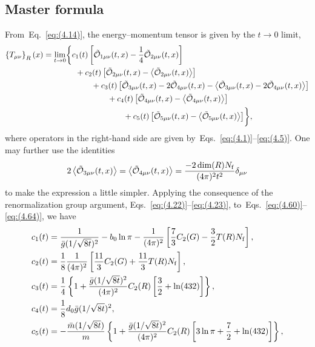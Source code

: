 \subsection{Master formula}
From~Eq.~\eqref{eq:(4.14)}, the energy--momentum tensor is given by the $t\to0$
limit,
\begin{align}
   \left\{T_{\mu\nu}\right\}_R(x)
   &=\lim_{t\to0}\biggl\{c_1(t)\left[
   \Tilde{\mathcal{O}}_{1\mu\nu}(t,x)
   -\frac{1}{4}\Tilde{\mathcal{O}}_{2\mu\nu}(t,x)
   \right]
\notag\\
   &\qquad\qquad{}
   +c_2(t)\left[
   \Tilde{\mathcal{O}}_{2\mu\nu}(t,x)
   -\left\langle\Tilde{\mathcal{O}}_{2\mu\nu}(t,x)\right\rangle
   \right]
\notag\\
   &\qquad\qquad\qquad{}
   +c_3(t)\left[
   \Tilde{\mathcal{O}}_{3\mu\nu}(t,x)
   -2\Tilde{\mathcal{O}}_{4\mu\nu}(t,x)
   -\left\langle
   \Tilde{\mathcal{O}}_{3\mu\nu}(t,x)
   -2\Tilde{\mathcal{O}}_{4\mu\nu}(t,x)
   \right\rangle
   \right]
\notag\\
   &\qquad\qquad\qquad\qquad{}
   +c_4(t)\left[
   \Tilde{\mathcal{O}}_{4\mu\nu}(t,x)
   -\left\langle\Tilde{\mathcal{O}}_{4\mu\nu}(t,x)\right\rangle
   \right]
\notag\\
   &\qquad\qquad\qquad\qquad\qquad{}
   +c_5(t)\left[
   \Tilde{\mathcal{O}}_{5\mu\nu}(t,x)
   -\left\langle\Tilde{\mathcal{O}}_{5\mu\nu}(t,x)\right\rangle
   \right]\biggr\},
\label{eq:(4.70)}
\end{align}
where operators in the right-hand side are given
by~Eqs.~\eqref{eq:(4.1)}--\eqref{eq:(4.5)}. One may further use the identities
\begin{equation}
   2\left\langle\Tilde{\mathcal{O}}_{3\mu\nu}(t,x)\right\rangle
   =\left\langle\Tilde{\mathcal{O}}_{4\mu\nu}(t,x)\right\rangle
   =\frac{-2\dim(R)N_{\mathrm{f}}}{(4\pi)^2t^2}\delta_{\mu\nu}
\label{eq:(4.71)}
\end{equation}
to make the expression a little simpler. Applying the consequence of the
renormalization group argument, Eqs.~\eqref{eq:(4.22)}--\eqref{eq:(4.23)},
to~Eqs.~\eqref{eq:(4.60)}--\eqref{eq:(4.64)}, we have
\begin{align}
   c_1(t)&
   =\frac{1}{\Bar{g}(1/\sqrt{8t})^2}
   -b_0\ln\pi-\frac{1}{(4\pi)^2}
   \left[\frac{7}{3}C_2(G)
   -\frac{3}{2}T(R)N_{\mathrm{f}}\right],
\label{eq:(4.72)}\\
   c_2(t)&
   =\frac{1}{8}
   \frac{1}{(4\pi)^2}
   \left[\frac{11}{3}C_2(G)
   +\frac{11}{3}T(R)N_{\mathrm{f}}\right],
\label{eq:(4.73)}\\
   c_3(t)&
   =\frac{1}{4}\left\{1+\frac{\Bar{g}(1/\sqrt{8t})^2}{(4\pi)^2}C_2(R)
   \left[\frac{3}{2}+\ln(432)\right]\right\},
\label{eq:(4.74)}\\
   c_4(t)&=\frac{1}{8}d_0\Bar{g}(1/\sqrt{8t})^2,
\label{eq:(4.75)}\\
   c_5(t)&=-\frac{\Bar{m}(1/\sqrt{8t})}{m}
   \left\{1+\frac{\Bar{g}(1/\sqrt{8t})^2}{(4\pi)^2}C_2(R)
   \left[3\ln\pi+\frac{7}{2}+\ln(432)\right]\right\},
\label{eq:(4.76)}
\end{align}
